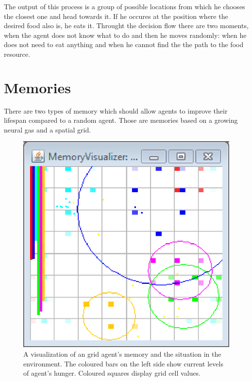 The output of this process is a group of possible locations from which he chooses the closest one and head towards it. If he occures at the position where the desired food also is, he eats it. Throught the decision flow there are two moments, when the agent does not know what to do and then he moves randomly: when he does not need to eat anything and when he cannot find the the path to the food resource.

\section{Memories}

There are two types of memory which should allow agents to improve their lifespan compared to a random agent. Those are memories based on a growing neural gas and a spatial grid.     

\begin{figure}      
\begin{center}
\includegraphics{images/app/grid_screenshot.eps}    
\caption{A visualization of an grid agent's memory and the situation in the environment. The coloured bars on the left side show current levels of agent's hunger. Coloured squares display grid cell values.}
\end{center}                          
\label{app:gridscreenshot}
\end{figure}

